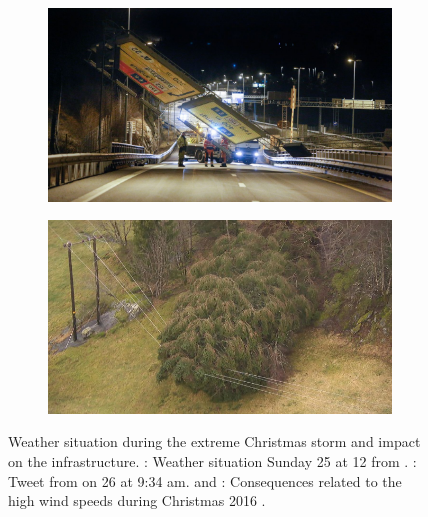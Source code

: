 \begin{figure}[t!]
\begin{subfigure}[b]{0.49\textwidth}
		\includegraphics[width=\textwidth]{./fig_introduction/street_sign_2512.jpg}
		\caption{}\label{fig:street_sign}
	\end{subfigure}
	\hfill
	\begin{subfigure}[b]{0.49\textwidth}
		\includegraphics[width=\textwidth]{./fig_introduction/tree_nrk_2812.jpg}
		\caption{}\label{fig:tree_elec}
	\end{subfigure}
	\caption{Weather situation during the extreme Christmas storm and impact on the infrastructure. \protect{}: Weather situation Sunday \SI{25}{\dec} at \SI{12}{\UTC} from 
		\citep{olsen_ekstremvaerrapport._2017}.
		\protect{}: Tweet from \cite{meteorologene_her_2016} on \SI{26}{\dec} at 9:34 am. %
		\protect{} and \protect{}: %
		Consequences related to the high wind speeds during Christmas 2016 \citep{ruud_tonn_2016,farestveit_80.000_2016}.
	} \label{fig:news}
\end{figure}